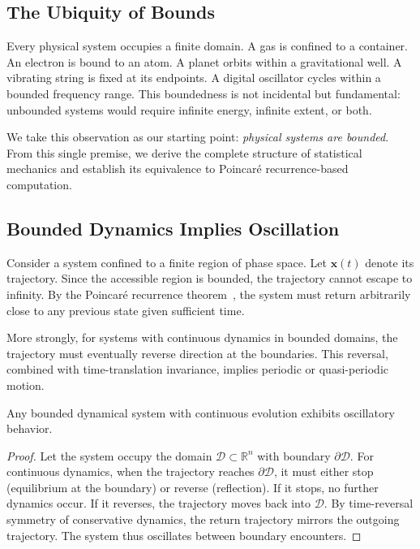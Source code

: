 
\subsection{The Ubiquity of Bounds}

Every physical system occupies a finite domain. A gas is confined to a container. An electron is bound to an atom. A planet orbits within a gravitational well. A vibrating string is fixed at its endpoints. A digital oscillator cycles within a bounded frequency range. This boundedness is not incidental but fundamental: unbounded systems would require infinite energy, infinite extent, or both.

We take this observation as our starting point: \textit{physical systems are bounded}. From this single premise, we derive the complete structure of statistical mechanics and establish its equivalence to Poincar\'e recurrence-based computation.

\subsection{Bounded Dynamics Implies Oscillation}

Consider a system confined to a finite region of phase space. Let $\mathbf{x}(t)$ denote its trajectory. Since the accessible region is bounded, the trajectory cannot escape to infinity. By the Poincar\'e recurrence theorem~\cite{poincare1890}, the system must return arbitrarily close to any previous state given sufficient time.

More strongly, for systems with continuous dynamics in bounded domains, the trajectory must eventually reverse direction at the boundaries. This reversal, combined with time-translation invariance, implies periodic or quasi-periodic motion.

\begin{proposition}
\label{prop:bounded_oscillation}
Any bounded dynamical system with continuous evolution exhibits oscillatory behavior.
\end{proposition}

\begin{proof}
Let the system occupy the domain $\mathcal{D} \subset \mathbb{R}^n$ with boundary $\partial\mathcal{D}$. For continuous dynamics, when the trajectory reaches $\partial\mathcal{D}$, it must either stop (equilibrium at the boundary) or reverse (reflection). If it stops, no further dynamics occur. If it reverses, the trajectory moves back into $\mathcal{D}$. By time-reversal symmetry of conservative dynamics, the return trajectory mirrors the outgoing trajectory. The system thus oscillates between boundary encounters.
\end{proof}


